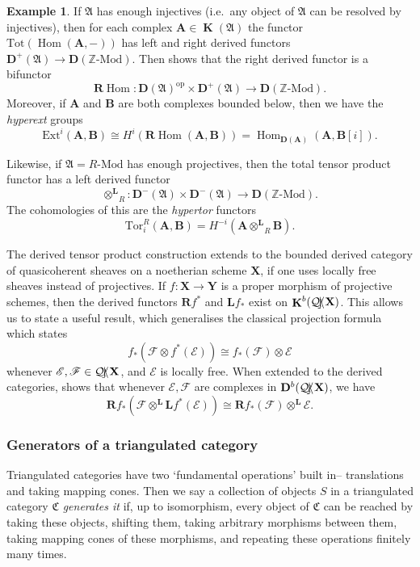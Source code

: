 \documentclass[a4paper]{article}
\theoremstyle{definition}
\newtheorem{example}[defn]{Example}
\theoremstyle{remark}
\newcommand{\Mod}{\ensuremath{\text{-Mod}}}
\DeclareMathOperator{\Hom}{\text{Hom}}
\DeclareMathOperator{\kom}{{\mathbf{K}}}
\newcommand{\deri}{\mathbf{D}}
\newcommand{\deritensor}{\ensuremath{\otimes^\mathbf{L}}}
\DeclareMathOperator{\Qcoh}{\mathcal{Q \kern -2pt c\kern -3pt o\kern -2pt h\kern -1pt}}
\begin{document}
\begin{example} 
    If \(\mathfrak{A}\) has enough injectives (i.e.\ any object of
    \(\mathfrak{A}\) can be resolved by injectives), then for each complex
    \(\mathbf{A}\in \kom(\mathfrak{A})\) the functor
    \(\text{Tot}(\Hom(\mathbf{A},-))\) has left and right derived functors
    \({\deri^+(\mathfrak{A})\rightarrow \deri(\mathbb{Z}\Mod)}\). Then
     shows that the right derived functor
    is a bifunctor 
    \[\mathbf{R}\Hom:\deri(\mathfrak{A})^\text{op}\times
    \deri^+(\mathfrak{A})\rightarrow \deri(\mathbb{Z}\Mod).\] 
    Moreover, if \(\mathbf{A}\) and \(\mathbf{B}\) are both complexes bounded
    below, then we have the \textit{hyperext} groups 
    \[\text{Ext}^i(\mathbf{A},\mathbf{B})\cong
    H^i(\mathbf{R}\Hom(\mathbf{A},\mathbf{B}))
    =\Hom_{\deri(\mathbf{A})}(\mathbf{A},\mathbf{B}[i]).\]

    Likewise, if \(\mathfrak{A}=R\Mod\) has enough projectives, then the total
    tensor product functor has a left derived functor 
    \[\deritensor_R: \deri^-(\mathfrak{A})\times
    \deri^-(\mathfrak{A})\rightarrow \deri(\mathbb{Z}\Mod).\]
    The cohomologies of this are the \textit{hypertor} functors 
    \[\text{Tor}^R_i(\mathbf{A},\mathbf{B}) =
    H^{-i}(\mathbf{A}\deritensor_R\mathbf{B}).\]
    
    The derived tensor product construction extends to the bounded derived
    category of quasicoherent sheaves on a noetherian scheme \(\mathbf{X}\), if
    one uses locally free sheaves instead of projectives. If
    \({f:\mathbf{X}\rightarrow \mathbf{Y}}\) is a proper morphism of projective
    schemes, then the derived functors \(\mathbf{R}f^\ast\) and
    \(\mathbf{L}f_\ast\) exist on \(\kom^b(\Qcoh \mathbf{X})\). This allows us to
    state a useful result, which generalises the classical projection formula
    which states 
    \[f_\ast(\mathscr{F}\otimes
    f^\ast (\mathscr{E}))\cong f_\ast(\mathscr{F})\otimes \mathscr{E}\]
    whenever \(\mathscr{E},\mathscr{F}\in \Qcoh\mathbf{X}\), and \(\mathscr{E}\)
    is locally free. When extended to the derived categories,
     shows that whenever
    \(\mathscr{E},\mathscr{F}\) are complexes in \(\deri^b(\Qcoh\mathbf{X})\),
    we have
    \[\mathbf{R}f_\ast(\mathscr{F}\deritensor
    \mathbf{L}f^\ast(\mathscr{E}))\cong\mathbf{R}f_\ast(\mathscr{F})\deritensor
    \mathscr{E}.\] 
\end{example}

\subsubsection{Generators of a triangulated category}
Triangulated categories have two `fundamental operations' built
in-- translations and taking mapping cones. Then we say a collection of objects
\(S\) in a triangulated category \(\mathfrak{C}\)
\textit{generates it} if, up to isomorphism, every object of \(\mathfrak{C}\)
can be reached by taking these objects, shifting them, taking arbitrary
morphisms between them, taking mapping cones of these morphisms, and repeating
these operations finitely many times. 
\end{document}
